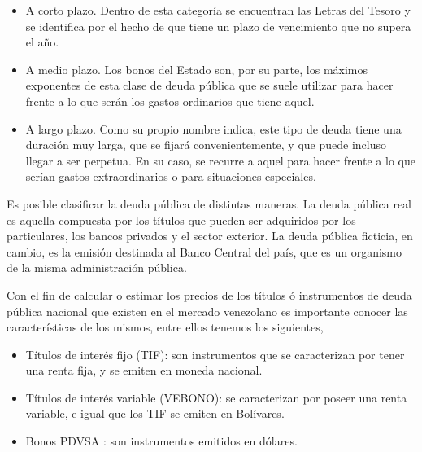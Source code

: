 \begin{itemize}
  \item A corto plazo. Dentro de esta categor\'ia se encuentran las Letras del Tesoro y se identifica por el hecho de que tiene un plazo de vencimiento que no supera el a\~no.
  \item A medio plazo. Los bonos del Estado son, por su parte, los m\'aximos exponentes de esta clase de deuda p\'ublica que se suele utilizar para hacer frente a lo que ser\'an los gastos ordinarios que tiene aquel.
  \item A largo plazo. Como su propio nombre indica, este tipo de deuda tiene una duraci\'on muy larga, que se fijar\'a convenientemente, y que puede incluso llegar a ser perpetua. En su caso, se recurre a aquel para hacer frente a lo que ser\'ian gastos extraordinarios o para situaciones especiales.
\end{itemize}


\hspace*{0.4 cm} Es posible clasificar la deuda p\'ublica de distintas maneras. La deuda p\'ublica real es aquella compuesta por los t\'itulos que pueden ser adquiridos por los particulares, los bancos privados y el sector exterior. La deuda p\'ublica ficticia, en cambio, es la emisi\'on destinada al Banco Central del pa\'is, que es un organismo de la misma administraci\'on p\'ublica.





\hspace*{0.4 cm} Con el fin de calcular o estimar los precios de los t\'itulos \'o instrumentos de deuda p\'ublica nacional que existen en el mercado venezolano es importante conocer las caracter\'isticas de los mismos, entre ellos tenemos los siguientes,

\vspace{0.4cm}

\begin{itemize}
  \item T\'itulos de inter\'es fijo (TIF): son instrumentos que se caracterizan por tener una renta fija, y se emiten en moneda nacional.
  \item T\'itulos de inter\'es variable (VEBONO): se caracterizan por poseer una renta variable, e igual que los TIF se emiten en Bol\'ivares.
  \item Bonos PDVSA : son instrumentos emitidos en d\'olares.
\end{itemize}

\vspace{0.5cm}

